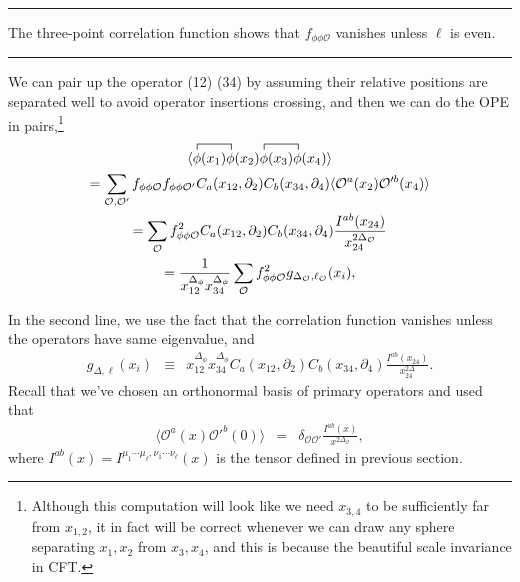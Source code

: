 \documentclass[12pt]{article}
\numberwithin{equation}{section}
\newcommand\be{\begin{eqnarray}}
\newcommand\ee{\end{eqnarray}}
\newcommand\f\phi
\newcommand\cO{\mathcal{O}}
\newcommand\ptl\partial
\newcommand\<\langle
\renewcommand\>\rangle
\newcommand\de\delta
\renewcommand\.{\cdot}
\newcommand\SO{\mathrm{SO}}
\newcommand\De{\Delta}
\begin{document}

\noindent\rule[0.5ex]{\linewidth}{1pt}
\label{exercise:elleven}
The three-point correlation function shows that $f_{\f\f\cO}$ vanishes unless $\ell$ is even.

\noindent\rule[0.5ex]{\linewidth}{1pt}

We can pair up the operator (12) (34) by assuming their relative positions are separated well to avoid operator insertions crossing, and then we can do the OPE in pairs,\footnote{Although this computation will look like we need $x_{3,4}$ to be sufficiently far from $x_{1,2}$, it in fact will be correct whenever we can draw any sphere separating $x_1,x_2$ from $x_3,x_4$, and this is because the beautiful scale invariance in CFT.}
\begin{multline}
\<
\contraction{}{\f}{(x_1)}{\f}
\f(x_1)\f(x_2)
\contraction{}{\f}{(x_1)}{\f}
\f(x_3)\f(x_4)
\> \\
= \sum_{\cO,\cO'}f_{\f\f\cO}f_{\f\f\cO'} C_a(x_{12},\ptl_2)C_b(x_{34},\ptl_4)\<\cO^a(x_2)\cO'^b(x_4)\> \\
= \sum_\cO f_{\f\f\cO}^2 C_a(x_{12},\ptl_2)C_b(x_{34},\ptl_4)\frac{I^{ab}(x_{24})}{x_{24}^{2\De_\cO}} \\
= \frac{1}{x_{12}^{\De_\f} x_{34}^{\De_\f}}\sum_\cO f_{\f\f\cO}^2 g_{\De_\cO,\ell_\cO}(x_i),
\end{multline}

In the second line, we use the fact that the correlation function vanishes unless the operators have same eigenvalue, and 
\be
\label{eq:olddefinitionofg}
g_{\De,\ell}(x_i) &\equiv& x_{12}^{\De_\f} x_{34}^{\De_\f} C_a(x_{12},\ptl_2)C_b(x_{34},\ptl_4)\frac{I^{ab}(x_{24})}{x_{24}^{2\De}}.
\ee
Recall that we've chosen an orthonormal basis of primary operators and used that
\be
\label{eq:canonicallynormalizedtwopt}
\<\cO^a(x)\cO'^b(0)\> &=& \de_{\cO\cO'} \frac{I^{ab}(x)}{x^{2\De_\cO}},
\ee
where $I^{ab}(x)=I^{\mu_1\cdots\mu_\ell,\nu_1\cdots\nu_\ell}(x)$ is the tensor defined in previous section.
\end{document}
